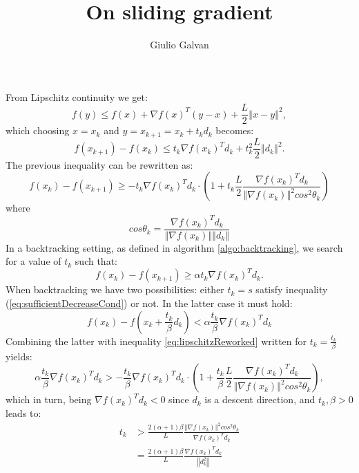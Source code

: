\documentclass{article}
\title{On sliding gradient}
\author{Giulio Galvan}
\newcommand{\norm}[1]{\left\Vert #1 \right\Vert}
\begin{document}
	\maketitle

\noindent	
From Lipschitz continuity we get:
\begin{equation}
	f(y) \leq f(x) + \nabla f(x)^T(y-x) + \frac{L}{2}\norm{x-y}^2,
\end{equation}
which choosing $x=x_k$ and $y=x_{k+1}=x_k + t_k d_k$ becomes:
\begin{equation}
	f(x_{k+1})-f(x_k) \leq t_k\nabla f(x_k)^Td_k+ t_k^2\frac{L}{2}\norm{d_k}^2.
\end{equation}
The previous inequality can be rewritten as:
\begin{equation}
f(x_k)- f(x_{k+1}) \geq - t_k\nabla f(x_k)^Td_k\cdot \left(1+t_k\frac{L}{2}\frac{\nabla f(x_k)^Td_k}{\norm{\nabla f(x_k)}^2 cos^2\theta_k}\right)
\label{eq:lipschitzReworked}
\end{equation}
where
\begin{equation}
cos\theta_k=\frac{\nabla f(x_k)^Td_k}{\norm{\nabla f(x_k)}\norm{d_k}}
\end{equation}
In a backtracking setting, as defined in algorithm \ref{algo:backtracking}, we search for a value of $t_k$ such that:
\begin{equation}
	f(x_k) - f(x_{k+1})\geq \alpha t_k \nabla f(x_k)^Td_k.
	\label{eq:sufficientDecreaseCond}
\end{equation}
When backtracking we have two possibilities: either $t_k=s$ satisfy inequality (\ref{eq:sufficientDecreaseCond}) or not. In the latter case it must hold:
\begin{equation}
		f(x_k)-f(x_{k}+\frac{t_k}{\beta}d_k) < \alpha \frac{t_k}{\beta} \nabla f(x_k)^Td_k
\label{eq:sufficientDecreaseViolated}
\end{equation}
Combining the latter with inequality \ref{eq:lipschitzReworked} written for $t_k=\frac{t_k}{\beta}$ yields:
\begin{equation}
\alpha \frac{t_k}{\beta} \nabla f(x_k)^Td_k > - \frac{t_k}{\beta}\nabla f(x_k)^Td_k\cdot \left(1+\frac{t_k}{\beta}\frac{L}{2}\frac{\nabla f(x_k)^Td_k}{\norm{\nabla f(x_k)}^2 cos^2\theta_k}\right),
\end{equation}
which in turn, being $\nabla f(x_k)^Td_k<0$ since $d_k$ is a descent direction, and $t_k,\beta>0$ leads to:
\begin{align}
	t_k &> \frac{2(\alpha+1)\beta}{L} \frac{\norm{\nabla f(x_k)}^2 cos^2\theta_k}{\nabla f(x_k)^Td_k} 	\label{eq:lowerBound}\\
	&=\frac{2(\alpha+1)\beta}{L}\frac{\nabla f(x_k)^Td_k}{\norm{d_k^2}}
\end{align}
\end{document}
